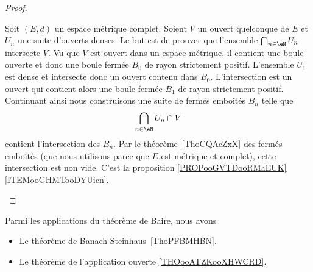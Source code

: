 \begin{proof}
\begin{subproof}
		Soit \( (E,d)\) un espace métrique complet. Soient \( V\) un ouvert quelconque de \( E\) et \( U_n\) une suite d'ouverts denses. Le but est de prouver que l'ensemble \( \bigcap_{n\in \eN}U_n\) intersecte \( V\). Vu que \( V\) est ouvert dans un espace métrique, il contient une boule ouverte et donc une boule fermée \( B_0\) de rayon strictement positif. L'ensemble \( U_1\) est dense et intersecte donc un ouvert contenu dans \( B_0\). L'intersection est un ouvert qui contient alors une boule fermée \( B_1\) de rayon strictement positif. Continuant ainsi nous construisons une suite de fermés emboités \( B_n\) telle que
		\begin{equation}
			\bigcap_{n\in \eN}U_n\cap V
		\end{equation}
		contient l'intersection des \( B_n\). Par le théorème~\ref{ThoCQAcZxX} des fermés emboîtés (que nous utilisons parce que \( E\) est métrique et complet), cette intersection est non vide.
		C'est la proposition \ref{PROPooGVTDooRMaEUK}\ref{ITEMooGHMTooDYUicn}.
	\end{subproof}
\end{proof}

Parmi les applications du théorème de Baire, nous avons
\begin{itemize}
	\item
	      Le théorème de Banach-Steinhaus~\ref{ThoPFBMHBN}.                   %
	\item
	      Le théorème de l'application ouverte \ref{THOooATZKooXHWCRD}.       %
\end{itemize}
